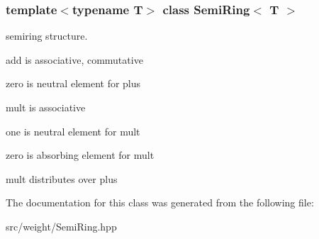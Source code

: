 \subsubsection*{template$<$typename T$>$\newline
class Semi\+Ring$<$ T $>$}

semiring structure. 


\begin{DoxyItemize}
\item add is associative, commutative
\item zero is neutral element for plus
\item mult is associative
\item one is neutral element for mult
\item zero is absorbing element for mult
\item mult distributes over plus 
\end{DoxyItemize}

The documentation for this class was generated from the following file\+:\begin{DoxyCompactItemize}
\item 
src/weight/Semi\+Ring.\+hpp\end{DoxyCompactItemize}
